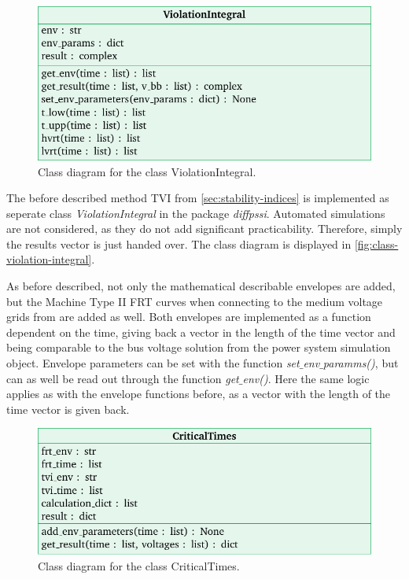 \begin{figure}[htbp!]
        \centering
        \includegraphics{tikz_graphics/images/class_diagram_violationintegral.pdf}
        \caption[Class diagram for the class ViolationIntegral]{Class diagram for the class ViolationIntegral.}
        \label{fig:class-violation-integral}
\end{figure}

The before described method \acs{TVI} from \autoref{sec:stability-indices} is implemented as seperate class \textit{ViolationIntegral} in the package \textit{diffpssi}.
Automated simulations are not considered, as they do not add significant practicability.
Therefore, simply the results vector is just handed over.
The class diagram is displayed in \autoref{fig:class-violation-integral}.

As before described, not only the mathematical describable envelopes are added, but the Machine Type II \acs{FRT} curves when connecting to the medium voltage grids from \autocite{vde-tar_2018,vde-tar_2023} are added as well.
Both envelopes are implemented as a function dependent on the time, giving back a vector in the length of the time vector and being comparable to the bus voltage solution from the power system simulation object.
Envelope parameters can be set with the function \textit{set$\_$env$\_$paramms()}, but can as well be read out through the function \textit{get$\_$env()}.
Here the same logic applies as with the envelope functions before, as a vector with the length of the time vector is given back.

\begin{figure}[htbp!]
        \centering
        \includegraphics{tikz_graphics/images/class_diagram_criticaltimes.pdf}
        \caption[Class diagram for the class CriticalTimes]{Class diagram for the class CriticalTimes.}
        \label{fig:class-critical-times}
\end{figure}

